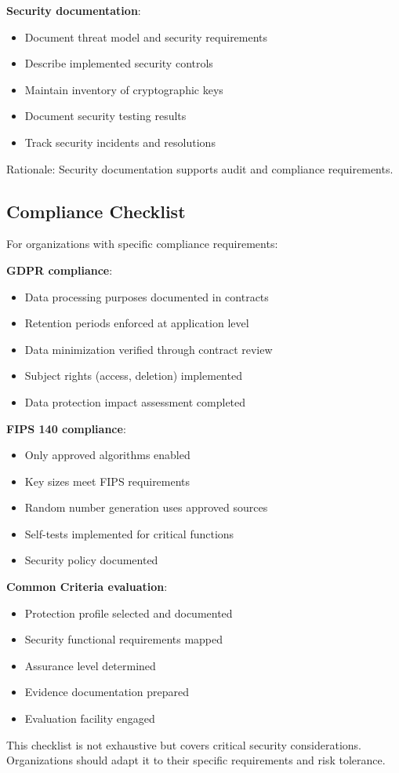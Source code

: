 \textbf{Security documentation}:

\begin{itemize}
\item Document threat model and security requirements
\item Describe implemented security controls
\item Maintain inventory of cryptographic keys
\item Document security testing results
\item Track security incidents and resolutions
\end{itemize}

Rationale: Security documentation supports audit and compliance
requirements.

\subsection{Compliance Checklist}

For organizations with specific compliance requirements:

\textbf{GDPR compliance}:

\begin{itemize}
\item Data processing purposes documented in contracts
\item Retention periods enforced at application level
\item Data minimization verified through contract review
\item Subject rights (access, deletion) implemented
\item Data protection impact assessment completed
\end{itemize}

\textbf{FIPS 140 compliance}:

\begin{itemize}
\item Only approved algorithms enabled
\item Key sizes meet FIPS requirements
\item Random number generation uses approved sources
\item Self-tests implemented for critical functions
\item Security policy documented
\end{itemize}

\textbf{Common Criteria evaluation}:

\begin{itemize}
\item Protection profile selected and documented
\item Security functional requirements mapped
\item Assurance level determined
\item Evidence documentation prepared
\item Evaluation facility engaged
\end{itemize}

This checklist is not exhaustive but covers critical security
considerations. Organizations should adapt it to their specific
requirements and risk tolerance.


